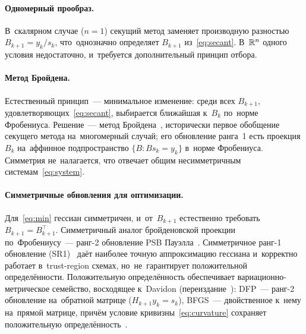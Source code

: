\paragraph{Одномерный прообраз.}
В~скалярном случае ($n=1$) секущий метод заменяет производную разностью
$B_{k+1}=y_k/s_k$, что~однозначно определяет $B_{k+1}$
из~\eqref{eq:secant}. В~$\mathbb{R}^n$ одного условия недостаточно, и~требуется
дополнительный принцип отбора.

\paragraph{Метод Бройдена.}
Естественный принцип~--- минимальное изменение: среди всех $B_{k+1}$,
удовлетворяющих~\eqref{eq:secant}, выбирается ближайшая к~$B_k$ по~норме
Фробениуса. Решение~--- метод Бройдена~\cite{broyden1965}, исторически
первое обобщение секущего метода на~многомерный случай; его обновление
ранга~1 есть проекция $B_k$ на~аффинное подпространство
$\{B : B s_k = y_k\}$ в~норме Фробениуса. Симметрия не~налагается, что
отвечает общим несимметричным системам~\eqref{eq:system}.

\paragraph{Симметричные обновления для оптимизации.}
Для~\eqref{eq:min} гессиан симметричен, и~от~$B_{k+1}$ естественно
требовать $B_{k+1}=B_{k+1}^\top$. Симметричный аналог бройденовской
проекции по~Фробениусу~--- ранг-2 обновление PSB
Пауэлла~\cite{powell1970}. Симметричное ранг-1 обновление
(SR1)~\cite{conn1991,bfgs} даёт наиболее точную аппроксимацию гессиана
и~корректно работает в~trust-region схемах, но~не~гарантирует
положительной определённости. Положительную определённость обеспечивает
вариационно-метрическое семейство, восходящее к~Davidon
(переиздание~\cite{davidon1991}): DFP~--- ранг-2 обновление на~обратной
матрице ($H_{k+1} y_k = s_k$), BFGS~--- двойственное к~нему на~прямой
матрице, причём условие кривизны~\eqref{eq:curvature} сохраняет
положительную определённость~\cite{bfgs}.

